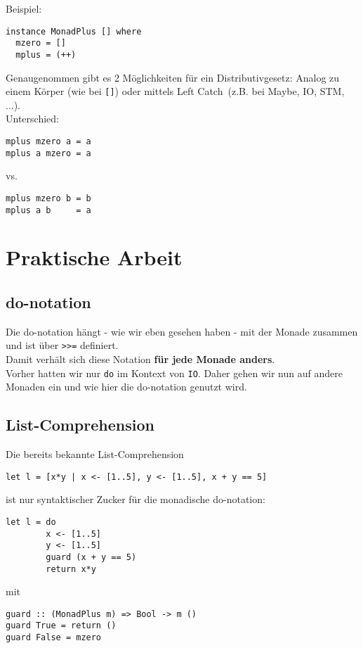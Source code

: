 \documentclass{beamer}
\begin{document}
\begin{frame}[fragile]
Beispiel:
\begin{verbatim}
instance MonadPlus [] where
  mzero = []
  mplus = (++)
\end{verbatim}
\pause
Genaugenommen gibt es 2 Möglichkeiten für ein Distributivgesetz: Analog zu einem Körper (wie bei \texttt{[]}) oder mittels \glqq Left Catch\grqq \ (z.B. bei Maybe, IO, STM, ...).\\
\pause
Unterschied:
\begin{verbatim}
mplus mzero a = a
mplus a mzero = a
\end{verbatim}
vs.
\begin{verbatim}
mplus mzero b = b
mplus a b     = a
\end{verbatim}
\end{frame}



\section{Praktische Arbeit}

\subsection{do-notation}
\begin{frame}[fragile]
Die do-notation hängt - wie wir eben gesehen haben - mit der Monade zusammen und ist über \texttt{>>=} definiert.\\
\pause
Damit verhält sich diese Notation \textbf{für jede Monade anders}.\\
\pause
Vorher hatten wir nur \texttt{do} im Kontext von \texttt{IO}. Daher gehen wir nun auf andere Monaden ein und wie hier die do-notation genutzt wird.
\end{frame}


\subsection{List-Comprehension}
\begin{frame}[fragile]
Die bereits bekannte List-Comprehension
\begin{verbatim}
let l = [x*y | x <- [1..5], y <- [1..5], x + y == 5]
\end{verbatim}
ist nur syntaktischer Zucker für die monadische do-notation:
\begin{verbatim}
let l = do
        x <- [1..5]
        y <- [1..5]
        guard (x + y == 5)
        return x*y
\end{verbatim}
mit
\begin{verbatim}
guard :: (MonadPlus m) => Bool -> m ()
guard True = return ()
guard False = mzero
\end{verbatim}

\end{frame}
\end{document}
